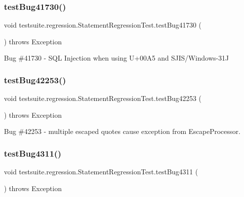 \subsubsection{\texorpdfstring{test\+Bug41730()}{testBug41730()}}
{\footnotesize\ttfamily void testsuite.\+regression.\+Statement\+Regression\+Test.\+test\+Bug41730 (\begin{DoxyParamCaption}{ }\end{DoxyParamCaption}) throws Exception}

Bug \#41730 -\/ S\+QL Injection when using U+00\+A5 and S\+J\+I\+S/\+Windows-\/31J \mbox{\label{classtestsuite_1_1regression_1_1_statement_regression_test_a9f883c6b6762ed6ca5fb1def78ce1e9f}} 
\subsubsection{\texorpdfstring{test\+Bug42253()}{testBug42253()}}
{\footnotesize\ttfamily void testsuite.\+regression.\+Statement\+Regression\+Test.\+test\+Bug42253 (\begin{DoxyParamCaption}{ }\end{DoxyParamCaption}) throws Exception}

Bug \#42253 -\/ multiple escaped quotes cause exception from Escape\+Processor. \mbox{\label{classtestsuite_1_1regression_1_1_statement_regression_test_af83dee9bd9b4ca7c1ab3fefcfbe705b3}} 
\subsubsection{\texorpdfstring{test\+Bug4311()}{testBug4311()}}
{\footnotesize\ttfamily void testsuite.\+regression.\+Statement\+Regression\+Test.\+test\+Bug4311 (\begin{DoxyParamCaption}{ }\end{DoxyParamCaption}) throws Exception}


